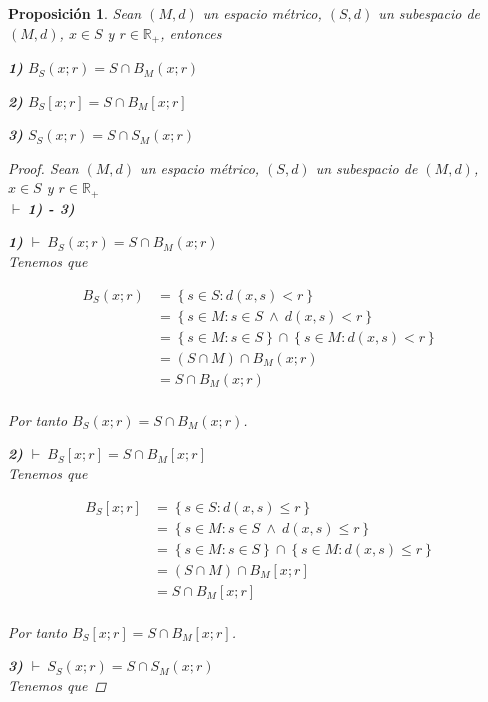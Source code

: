 \documentclass[oneside]{book} %
\theoremstyle{Teorema}
\newtheorem{Proposicion}[Definicion]{Proposición}
\theoremstyle{Ejemplos}
\theoremstyle{[Obs]}
\renewcommand{\{}{\left\lbrace} %
\renewcommand{\}}{\right\rbrace} %
\newcommand{\y}{\ \wedge\ } %
\newcommand{\n}{\cap} %
\newcommand{\R}{\mathbb{R}} %
\newcommand{\pd}{$\vdash\ $} %
\begin{document}
			\begin{Proposicion}\setlength{\parindent}{0em}
				
				Sean $(M, d)$ un espacio métrico, $(S, d)$ un subespacio de $(M, d)$, $x \in S$ y $r \in \R_{+}$, entonces

				\textbf{1)} $B_S(x;r) = S \n B_M(x;r)$
				
				\textbf{2)} $B_S[x;r] = S \n B_M[x;r]$

				\textbf{3)} $S_S(x;r) = S \n S_M(x;r)$

				\begin{proof}
					
					Sean $(M, d)$ un espacio métrico, $(S, d)$ un subespacio de $(M, d)$, $x \in S$ y $r \in \R_{+}$ \\ 
					\pd \textbf{1) - 3)}

					\textbf{1)} \pd $B_S(x;r) = S \n B_M(x;r)$ \\
					Tenemos que 

					\begin{align*}
						B_S(x;r) & = \{ s \in S : d(x, s) < r \} \\
						& = \{ s \in M: s \in S \y d(x, s) < r \} \\ 
						& = \{ s \in M : s \in S\} \n \{ s \in M : d(x, s) < r \} \\ 
						& = (S \n M) \n B_M(x;r) \\ 
						& = S \n B_M(x;r) \\ 
					\end{align*}

					Por tanto $B_S(x;r) = S \n B_M(x;r)$.

					\textbf{2)} \pd $B_S[x;r] = S \n B_M[x;r]$ \\
					Tenemos que 

					\begin{align*}
						B_S[x;r] & = \{ s \in S : d(x, s) \leq r \} \\
						& = \{ s \in M: s \in S \y d(x, s) \leq r \} \\ 
						& = \{ s \in M : s \in S\} \n \{ s \in M : d(x, s) \leq r \} \\ 
						& = (S \n M) \n B_M[x;r] \\ 
						& = S \n B_M[x;r] \\ 
					\end{align*}

					Por tanto $B_S[x;r] = S \n B_M[x;r]$.

					\textbf{3)} \pd $S_S(x;r) = S \n S_M(x;r)$ \\
					Tenemos que 


\end{proof}
\end{Proposicion}
\end{document}
